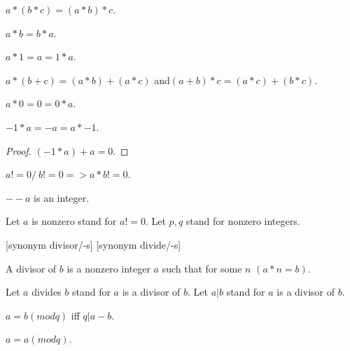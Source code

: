 \documentclass{document}
\begin{document}
\begin{forthel}
    \begin{axiom}[MulAsso]
      $a * (b * c) = (a * b) * c$.
    \end{axiom}

    \begin{axiom}[MulComm]
      $a * b = b * a$.
    \end{axiom}

    \begin{axiom}[MulOne]
      $a * 1 = a = 1 * a$.
    \end{axiom}

    \begin{axiom}[Distrib]
      $a * (b + c) = (a*b) + (a*c)$ and$ (a + b) * c = (a*c) + (b*c)$.
    \end{axiom}

    \begin{lemma}[MulZero]
      $a * 0 = 0 = 0 * a$.
    \end{lemma}

    \begin{lemma}[MulMinOne]
      $-1 * a = -a = a * -1$.
    \end{lemma}
    \begin{proof}
      $(-1 * a) + a = 0$.
    \end{proof}

    \begin{axiom}[ZeroDiv]
      $a != 0 /\ b != 0 => a * b != 0$.
    \end{axiom}

    \begin{lemma}
      $--a$ is an integer.
    \end{lemma}

    Let $a$ is nonzero stand for $a != 0$.
    Let $p,q$ stand for nonzero integers.

    [synonym divisor/-s] [synonym divide/-s]

    \begin{definition}[Divisor]
      A divisor of $b$ is a nonzero integer $a$ such that for some $n$ $(a * n = b)$.
    \end{definition}

    Let $a$ divides $b$ stand for $a$ is a divisor of $b$.
    Let $a | b$ stand for $a$ is a divisor of $b$.

    \begin{definition}[EquMod]
      $a = b (mod q)$ iff $q | a-b$.
    \end{definition}

    \begin{lemma}[EquModRef]
      $a = a (mod q)$.
    \end{lemma}


\end{forthel}
\end{document}
